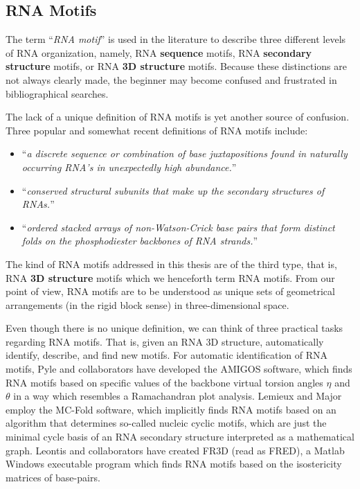 \subsection{RNA Motifs}
The term ``\textit{RNA motif}'' is  used in the literature to describe
three   different   levels    of   RNA   organization,   namely,   RNA
\textbf{sequence} motifs, RNA  \textbf{secondary structure} motifs, or
RNA \textbf{3D structure} motifs.   Because these distinctions are not
always clearly  made, the beginner may become  confused and frustrated
in bibliographical searches.

The lack of a unique definition of RNA motifs is yet another source of
confusion.  Three  popular and  somewhat  recent  definitions of  RNA
motifs include:
\begin{itemize}
\item{``\textit{a discrete sequence or combination of
    base  juxtapositions   found  in  naturally   occurring  RNA's  in
    unexpectedly high abundance.}''\cite{moore1999}}
\item{``\textit{conserved structural subunits that make
    up the secondary structures of RNAs.}''\cite{holbrook2005}}
\item{``\textit{ordered   stacked    arrays   of
    non-Watson-Crick  base  pairs  that  form distinct  folds  on  the
    phosphodiester backbones of RNA strands.}''\cite{leontis2003}}
\end{itemize}

The  kind of RNA  motifs addressed in this
thesis are of the third type, that is, RNA \textbf{3D structure}
motifs  which we henceforth term RNA  motifs.
From our point of view, RNA motifs are to be understood as  unique
sets of geometrical  arrangements (in the rigid block sense) in
three-dimensional space.

Even  though there  is no  unique definition,  we can  think  of three
practical  tasks regarding  RNA  motifs.   That is,  given  an RNA  3D
structure, automatically identify, describe,  and find new motifs.  For
automatic  identification of  RNA motifs,  Pyle and  collaborators have
developed  the AMIGOS software, which finds  RNA motifs
based on  specific values of the backbone virtual  torsion angles $\eta$
and  $\theta$  \cite{olson1980, malathi1985,  duarte2003} in  a  way  which
resembles   a   Ramachandran  plot   analysis.    Lemieux  and   Major
\cite{lemieux2006}  employ  the  MC-Fold software,  which  implicitly
finds RNA motifs based on  an algorithm that determines so-called nucleic
cyclic  motifs, which  are  just the  minimal  cycle basis  of an  RNA
secondary  structure  interpreted as  a  mathematical graph.   Leontis
\cite{nasalean2009}  and collaborators have created FR3D  (read  as FRED),
a Matlab  Windows executable program  which finds  RNA motifs
based on the isostericity matrices of base-pairs.


